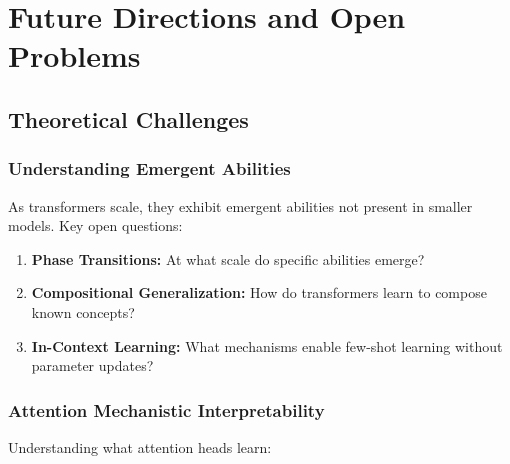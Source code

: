 \section{Future Directions and Open Problems}

\subsection{Theoretical Challenges}

\subsubsection{Understanding Emergent Abilities}

As transformers scale, they exhibit emergent abilities not present in smaller models. Key open questions:

\begin{enumerate}
    \item \textbf{Phase Transitions:} At what scale do specific abilities emerge?
    \item \textbf{Compositional Generalization:} How do transformers learn to compose known concepts?
    \item \textbf{In-Context Learning:} What mechanisms enable few-shot learning without parameter updates?
\end{enumerate}

\subsubsection{Attention Mechanistic Interpretability}

Understanding what attention heads learn:

